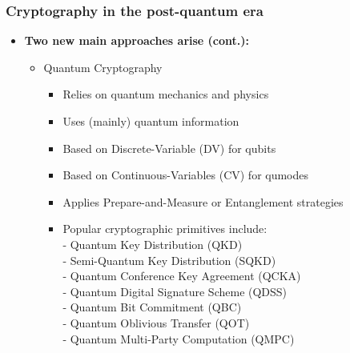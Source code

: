 \documentclass{beamer}
\begin{document}
        \begin{frame}
			\frametitle{\LARGE Cryptography in the post-quantum era}

            \vspace{2.5ex}
			\begin{itemize}
                \item \textbf{Two new main approaches arise (cont.):}
                \begin{itemize}
                    \item Quantum Cryptography
                    \begin{itemize}
                        \item Relies on quantum mechanics and physics
                        \item Uses (mainly) quantum information
                        \item Based on Discrete-Variable (DV) for qubits
                        \item Based on Continuous-Variables (CV) for qumodes
                        \item Applies Prepare-and-Measure or Entanglement strategies
                        \item Popular cryptographic primitives include:\\
                        - Quantum Key Distribution (QKD)\\
                        - Semi-Quantum Key Distribution (SQKD)\\
                        - Quantum Conference Key Agreement (QCKA)\\
                        - Quantum Digital Signature Scheme (QDSS)\\
                        - Quantum Bit Commitment (QBC)\\
                        - Quantum Oblivious Transfer (QOT)\\
                        - Quantum Multi-Party Computation (QMPC)\\
                    \end{itemize}
                \end{itemize}
            \end{itemize}
		\end{frame}
\end{document}
